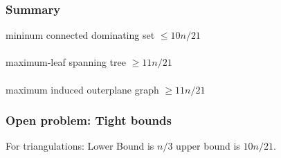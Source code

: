 \documentclass{beamer}
\newcommand{\verteq}{\rotatebox{90}{$\equiv$}}
\begin{document}
\begin{frame}
\begin{center}
\end{center}
\end{frame}

\begin{frame}
  \frametitle{Summary}

    \begin{center}
      mininum connected dominating set ${}\le 10n/21$ \\ \verteq \\
      maximum-leaf spanning tree ${}\ge 11n/21$ \\ \verteq \\
      maximum induced outerplane graph ${}\ge 11n/21$ \\
    \end{center}

\end{frame}


\begin{frame}
  \frametitle{Open problem: Tight bounds}

  For triangulations: Lower Bound is $n/3$ upper bound is $10n/21$.
\end{frame}

%
%
%
%
%
%
%
%
%

\begin{frame}


\end{frame}
\end{document}
